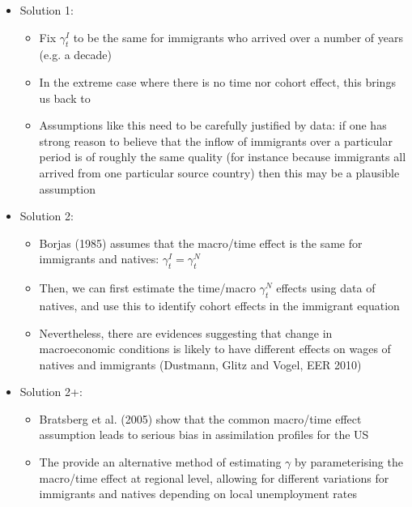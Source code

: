             \begin{itemize}
                \item Solution 1: 
                    \begin{itemize}
                        \item Fix $\gamma_{t}^I$ to be the same for immigrants who arrived over a number of years (e.g. a decade)
                        \item In the extreme case where there is no time nor cohort effect, this brings us back to \cite{chiswick_effect_1978}
                        \item Assumptions like this need to be carefully justified by data: if one has strong reason to believe that the inflow of immigrants over a particular period is of roughly the same quality (for instance because immigrants all arrived from one particular source country) then this may be a plausible assumption
                    \end{itemize}
                \item Solution 2: 
                    \begin{itemize}
                        \item Borjas (1985) assumes that the macro/time effect is the same for immigrants and natives: $\gamma_{t}^I=\gamma_{t}^N$
                        \item Then, we can first estimate the time/macro $\gamma_{t}^N$ effects using data of natives, and use this to identify cohort effects in the immigrant equation
                        \item Nevertheless, there are evidences suggesting that change in macroeconomic conditions is likely to have different effects on wages of natives and immigrants (Dustmann, Glitz and Vogel, EER 2010)
                    \end{itemize}
                \item Solution 2+: 
                    \begin{itemize}
                        \item Bratsberg et al. (2005) show that the common macro/time effect assumption leads to serious bias in assimilation profiles for the US
                        \item The provide an alternative method of estimating $\gamma$ by parameterising the macro/time effect at regional level, allowing for different variations for immigrants and natives depending on local unemployment rates
                    \end{itemize}
            \end{itemize}

